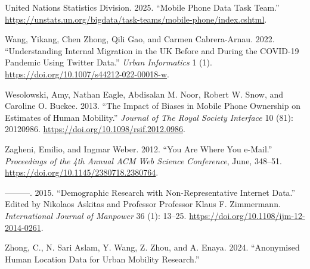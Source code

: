 \documentclass{article}
\newlength{\cslhangindent}
\newenvironment{CSLReferences}[2] %
 {\begin{list}{}{%
  \setlength{\itemindent}{0pt}
  \setlength{\leftmargin}{0pt}
  \setlength{\parsep}{0pt}
  \ifodd #1
   \setlength{\leftmargin}{\cslhangindent}
   \setlength{\itemindent}{-1\cslhangindent}
  \fi
  \setlength{\itemsep}{#2\baselineskip}}}
 {\end{list}}
\begin{document}
\begin{CSLReferences}{1}{0}
United Nations Statistics Division. 2025. {``Mobile Phone Data Task Team.''} \url{https://unstats.un.org/bigdata/task-teams/mobile-phone/index.cshtml}.

Wang, Yikang, Chen Zhong, Qili Gao, and Carmen Cabrera-Arnau. 2022. {``Understanding Internal Migration in the UK Before and During the COVID-19 Pandemic Using Twitter Data.''} \emph{Urban Informatics} 1 (1). \url{https://doi.org/10.1007/s44212-022-00018-w}.

Wesolowski, Amy, Nathan Eagle, Abdisalan M. Noor, Robert W. Snow, and Caroline O. Buckee. 2013. {``The Impact of Biases in Mobile Phone Ownership on Estimates of Human Mobility.''} \emph{Journal of The Royal Society Interface} 10 (81): 20120986. \url{https://doi.org/10.1098/rsif.2012.0986}.

Zagheni, Emilio, and Ingmar Weber. 2012. {``You Are Where You e-Mail.''} \emph{Proceedings of the 4th Annual ACM Web Science Conference}, June, 348--51. \url{https://doi.org/10.1145/2380718.2380764}.

---------. 2015. {``Demographic Research with Non-Representative Internet Data.''} Edited by Nikolaos Askitas and Professor Professor Klaus F. Zimmermann. \emph{International Journal of Manpower} 36 (1): 13--25. \url{https://doi.org/10.1108/ijm-12-2014-0261}.

Zhong, C., N. Sari Aslam, Y. Wang, Z. Zhou, and A. Enaya. 2024. {``Anonymised Human Location Data for Urban Mobility Research.''}

\end{CSLReferences}
\end{document}
